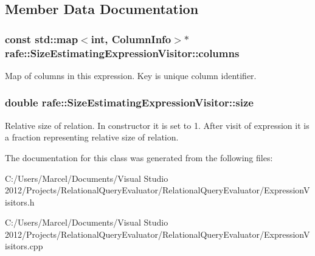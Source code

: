 \subsection{Member Data Documentation}
\hypertarget{classrafe_1_1_size_estimating_expression_visitor_ad3b98fc9a1c8b0a90f5ed341c97711cf}{
\subsubsection[{columns}]{\setlength{\rightskip}{0pt plus 5cm}const std\+::map$<$int, {\bf Column\+Info}$>$$\ast$ rafe\+::\+Size\+Estimating\+Expression\+Visitor\+::columns}}\label{classrafe_1_1_size_estimating_expression_visitor_ad3b98fc9a1c8b0a90f5ed341c97711cf}
Map of columns in this expression. Key is unique column identifier. \hypertarget{classrafe_1_1_size_estimating_expression_visitor_a2e4df15583ab7fc3d6ac55b099ccd468}{
\subsubsection[{size}]{\setlength{\rightskip}{0pt plus 5cm}double rafe\+::\+Size\+Estimating\+Expression\+Visitor\+::size}}\label{classrafe_1_1_size_estimating_expression_visitor_a2e4df15583ab7fc3d6ac55b099ccd468}
Relative size of relation. In constructor it is set to 1. After visit of expression it is a fraction representing relative size of relation. 

The documentation for this class was generated from the following files\+:\begin{DoxyCompactItemize}
\item 
C\+:/\+Users/\+Marcel/\+Documents/\+Visual Studio 2012/\+Projects/\+Relational\+Query\+Evaluator/\+Relational\+Query\+Evaluator/Expression\+Visitors.\+h\item 
C\+:/\+Users/\+Marcel/\+Documents/\+Visual Studio 2012/\+Projects/\+Relational\+Query\+Evaluator/\+Relational\+Query\+Evaluator/Expression\+Visitors.\+cpp\end{DoxyCompactItemize}
